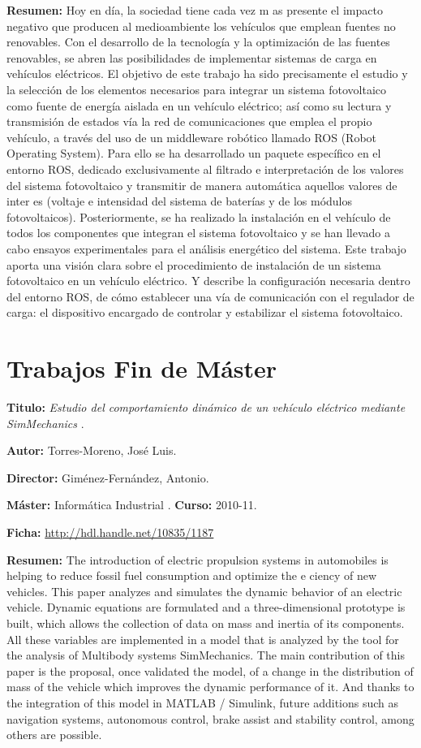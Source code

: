 \textbf{Resumen:} Hoy en día, la sociedad tiene cada vez m as presente el impacto negativo que producen al medioambiente los vehículos que emplean fuentes no renovables. Con el desarrollo de la tecnología y la optimización de las fuentes renovables, se abren las posibilidades de implementar sistemas de carga en vehículos eléctricos. El objetivo de este trabajo ha sido precisamente el estudio y la selección de los elementos necesarios para integrar un sistema fotovoltaico como fuente de energía aislada en un vehículo eléctrico; así como su lectura y transmisión de estados vía la red de comunicaciones que emplea el propio vehículo, a través del uso de un middleware robótico llamado ROS (Robot Operating System). Para ello se ha desarrollado un paquete específico en el entorno ROS, dedicado exclusivamente al filtrado e interpretación de los valores del sistema fotovoltaico y transmitir de manera automática aquellos valores de inter es (voltaje e intensidad del sistema de baterías y de los módulos fotovoltaicos). Posteriormente, se ha realizado la instalación en el vehículo de todos los componentes que integran el sistema fotovoltaico y se han llevado a cabo ensayos experimentales para el análisis energético del sistema. Este trabajo aporta una visión clara sobre el procedimiento de instalación de un sistema fotovoltaico en un vehículo eléctrico. Y describe la configuración necesaria dentro del entorno ROS, de cómo establecer una vía de comunicación con el regulador de carga: el
dispositivo encargado de controlar y estabilizar el sistema fotovoltaico.
 
\section{Trabajos Fin de Máster}
\textbf{Titulo:} \textit{Estudio del comportamiento dinámico de un vehículo eléctrico mediante SimMechanics} \cite{torres2011UALeCARM}.

\textbf{Autor:} Torres-Moreno, José Luis.

\textbf{Director:} Giménez-Fernández, Antonio.

\textbf{Máster:} Informática Industrial . \textbf{Curso:} 2010-11. 

\textbf{Ficha:} \url{http://hdl.handle.net/10835/1187}
 
\textbf{Resumen:} The introduction of electric propulsion systems in automobiles is helping to reduce fossil fuel consumption and optimize the e ciency of new vehicles. This paper analyzes and simulates the dynamic behavior of an electric vehicle. Dynamic equations are formulated and a three-dimensional prototype is built, which allows the collection of data on mass and inertia of its components. All these variables are implemented in a model that is analyzed by the tool for the analysis of Multibody systems SimMechanics. The main contribution of this paper is the proposal, once validated the model, of a change in the distribution of mass of the vehicle which improves the dynamic performance of it. And thanks to the integration of this model in MATLAB / Simulink, future additions such as navigation systems, autonomous control, brake assist and stability control, among others are possible.
 

